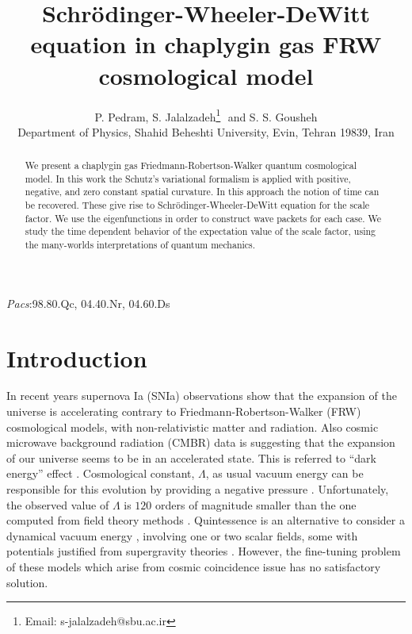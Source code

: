 \textheight 640pt \textwidth 480pt \oddsidemargin 0pt \voffset -1.5cm
\title{Schr\"odinger-Wheeler-DeWitt equation in chaplygin gas FRW cosmological model}
\author{P. Pedram, S. Jalalzadeh\thanks{Email: s-jalalzadeh@sbu.ac.ir}\,\, and S. S. Gousheh
\\ {\small Department of Physics, Shahid Beheshti University,
Evin, Tehran 19839, Iran}}

\maketitle \baselineskip 24pt
\begin{abstract}
We present a chaplygin gas Friedmann-Robertson-Walker quantum
cosmological model. In this work the Schutz's variational formalism
is applied with positive, negative, and zero constant spatial
curvature. In this approach the notion of time can be recovered.
These give rise to Schr\"odinger-Wheeler-DeWitt equation for the
scale factor. We use the eigenfunctions in order to construct wave
packets for each case. We study the time dependent behavior of the
expectation value of the scale factor, using the many-worlds
interpretations of quantum mechanics.
\end{abstract}

\textit{Pacs}:{98.80.Qc, 04.40.Nr, 04.60.Ds}

\section{Introduction}
In recent years supernova Ia  (SNIa) observations show that the expansion of the universe is
accelerating \cite{Riess:1998cb} contrary to Friedmann-Robertson-Walker (FRW) cosmological models,
with non-relativistic matter and radiation. Also cosmic microwave background radiation (CMBR) data
\cite{Spergel:2003cb,2a} is suggesting  that the expansion of our universe seems to be in an
accelerated state. This is referred to ``dark energy'' effect \cite{3a}. Cosmological constant,
$\Lambda $, as usual vacuum energy can be responsible for this evolution by providing a negative
pressure \cite{3b,3c}. Unfortunately, the observed value of $\Lambda$ is $120$ orders of magnitude
smaller than the one computed from field theory methods \cite{3b,3c}. Quintessence is an
alternative to consider a dynamical vacuum energy \cite{Wetterich:fm}, involving one or two scalar
fields, some with potentials justified from supergravity theories \cite{Brax:1999yv}. However, the
fine-tuning problem of these models which arise from cosmic coincidence issue has no satisfactory
solution.

